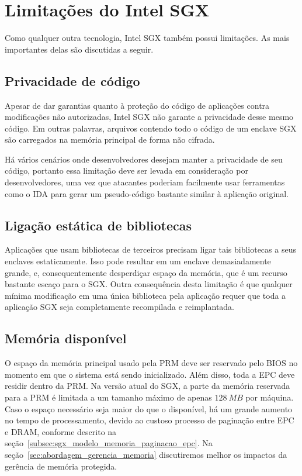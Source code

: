 \section{Limitações do Intel SGX}
\label{sec:sgx_limitacoes}

Como qualquer outra tecnologia, Intel SGX também possui limitações. As mais
importantes delas são discutidas a seguir.

\subsection{Privacidade de código}
\label{subsec:sgx_limitacoes_privacidade_codigo}

Apesar de dar garantias quanto à proteção do código de aplicações contra
modificações não autorizadas, Intel SGX não garante a privacidade desse mesmo
código. Em outras palavras, arquivos contendo todo o código de um enclave SGX
são carregados na memória principal de forma não cifrada.

Há vários cenários onde desenvolvedores desejam manter a privacidade de seu
código, portanto essa limitação deve ser levada em consideração por
desenvolvedores, uma vez que atacantes poderiam facilmente usar ferramentas como
o IDA \cite{idapro} para gerar um pseudo-código bastante similar à aplicação
original.

\subsection{Ligação estática de bibliotecas}
\label{subsec:sgx_limitacoes_ligacao_estatica}

Aplicações que usam bibliotecas de terceiros precisam ligar tais bibliotecas a
seus enclaves estaticamente. Isso pode resultar em um enclave demasiadamente
grande, e, consequentemente desperdiçar espaço da memória, que é um recurso
bastante escaço para o SGX. Outra consequência desta limitação é que qualquer
mínima modificação em uma única biblioteca pela aplicação requer que toda a
aplicação SGX seja completamente recompilada e reimplantada.

\subsection{Memória disponível}
\label{subsec:sgx_limitacoes_memoria}

O espaço da memória principal usado pela PRM deve ser reservado pelo BIOS no
momento em que o sistema está sendo inicializado. Além disso, toda a EPC deve
residir dentro da PRM. Na versão atual do SGX, a parte da memória reservada para
a PRM é limitada a um tamanho máximo de apenas $128\ MB$ por máquina. Caso o espaço
necessário seja maior do que o disponível, há um grande aumento no tempo de
processamento, devido ao custoso processo de paginação entre EPC e DRAM,
conforme descrito na seção~\ref{subsec:sgx_modelo_memoria_paginacao_epc}. Na
seção~\ref{sec:abordagem_gerencia_memoria} discutiremos melhor os impactos da
gerência de memória protegida.

